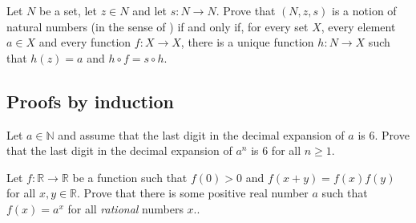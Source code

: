 \begin{chapex}
Let $N$ be a set, let $z \in N$ and let $s : N \to N$. Prove that $(N, z, s)$ is a notion of natural numbers (in the sense of ) if and only if, for every set $X$, every element $a \in X$ and every function $f : X \to X$, there is a unique function $h : N \to X$ such that $h(z)=a$ and $h \circ f = s \circ h$.
\end{chapex}

\subsection*{Proofs by induction}

\begin{chapex}
Let $a \in \mathbb{N}$ and assume that the last digit in the decimal expansion of $a$ is $6$. Prove that the last digit in the decimal expansion of $a^n$ is $6$ for all $n \ge 1$.
\end{chapex}

\begin{chapex}
Let $f : \mathbb{R} \to \mathbb{R}$ be a function such that $f(0) > 0$ and $f(x+y)=f(x)f(y)$ for all $x,y \in \mathbb{R}$. Prove that there is some positive real number $a$ such that $f(x)=a^x$ for all \textit{rational} numbers $x$..
\end{chapex}